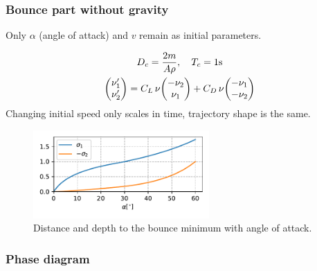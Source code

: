 \documentclass{beamer}
\begin{document}
\begin{frame}

\frametitle{Bounce part without gravity}
Only $\alpha$ (angle of attack) and $v$ remain as initial parameters.

\begin{gather}
D_c = \dfrac{2m}{A \rho}, \quad T_c = 1 \mathrm{s}
\\
\mqty( \nu_1' \\ \nu_2' \\) = C_L  \, \nu \mqty(-\nu_2 \\ \nu_1\\) + C_D \, \nu \mqty(-\nu_1 \\ -\nu_2\\)
\end{gather}
Changing initial speed only scales in time, trajectory shape is the same.

\vspace{-3mm}

\begin{figure}[H]
	\centering
	  \includegraphics[width= 0.6\textwidth]{distance_to_bounce.pdf}
	  \captionsetup{justification=centering,margin=0cm}
	  \caption{Distance and depth to the bounce minimum with angle of attack.}
\end{figure}


\end{frame}


\begin{frame}

\frametitle{Phase diagram}


\end{frame}

\end{document}
